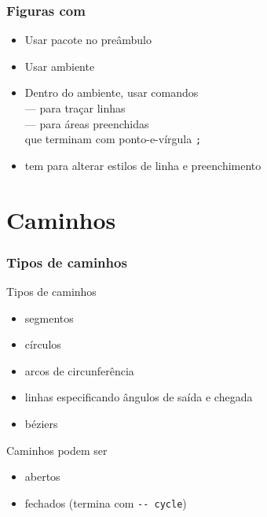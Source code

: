 \begin{frame}
  \frametitle{Figuras com \Tikz}

  \begin{itemize}
  \item Usar pacote  no preâmbulo
  \item Usar ambiente 
  \item Dentro do ambiente, usar comandos\\
     --- para traçar linhas\\
     --- para áreas preenchidas\\
    que terminam com ponto-e-vírgula \texttt{;}
  \item tem  para alterar estilos
    de linha e preenchimento

\begin{multicols}{2}

\end{multicols}

  \end{itemize}
\end{frame}

\section{Caminhos}

\begin{frame}
  \frametitle{Tipos de caminhos}

  \begin{block}{Tipos de caminhos}
    \begin{itemize}
    \item segmentos
    \item círculos
    \item arcos de circunferência
    \item linhas especificando ângulos de saída e chegada
    \item béziers
    \end{itemize}
  \end{block}

\bigskip

  Caminhos podem ser
  \begin{itemize}
  \item abertos
  \item fechados (termina com \texttt{-{}- cycle})
  \end{itemize}

\end{frame}

